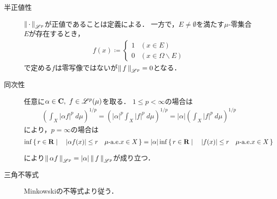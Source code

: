 \begin{prf}\mbox{}
	\begin{description}
	\item[半正値性] $\left\|\, \cdot\, \right\|_{\mathscr{L}^p}$が正値であることは定義による．
		一方で，$E \neq \emptyset$を満たす$\mu$-零集合$E$が存在するとき，
		\begin{align}
			f(x) \coloneqq
			\begin{cases}
				1 & (x \in E) \\
				0 & (x \in \Omega \backslash E)
			\end{cases}
		\end{align}
		で定める$f$は零写像ではないが$\left\|\, f\, \right\|_{\mathscr{L}^p} = 0$となる．
		
	\item[同次性] 
		任意に$\alpha \in \mathbf{C},\ f \in \mathscr{L}^p(\mu)$を取る．
		$1 \leq p < \infty$の場合は
		\begin{align}
			\left( \int_{X} |\alpha f|^p\ d\mu \right)^{1/p} = \left( |\alpha|^p \int_{X} |f|^p\ d\mu \right)^{1/p} 
			= |\alpha| \left( \int_{X} |f|^p\ d\mu \right)^{1/p}
		\end{align}
		により，$p = \infty$の場合は
		\begin{align}
			\operatorname*{inf}_{} \left\{\, r \in \mathbf{R} \mid \quad |\alpha f(x)| \leq r \quad \mbox{$\mu$-a.e.}x \in X\, \right\} = |\alpha|\operatorname*{inf}_{} \left\{\, r \in \mathbf{R} \mid \quad |f(x)|  \leq r \quad \mbox{$\mu$-a.e.}x \in X\, \right\}
		\end{align}
		により$\left\|\, \alpha f\, \right\|_{\mathscr{L}^p} = |\alpha|\left\|\, f\, \right\|_{\mathscr{L}^p}$が成り立つ．
		
	\item[三角不等式] Minkowskiの不等式より従う．
	\QED
	\end{description}
\end{prf}

